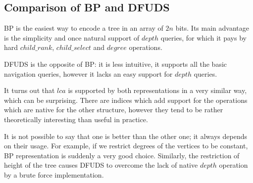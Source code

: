 \subsection{Comparison of BP and DFUDS}

BP is the easiest way to encode a tree in an array of $2n$ bits.
Its main advantage is the simplicity and once natural support of $depth$ queries, for which it pays by hard $child\_rank$, $child\_select$ and $degree$ operations.

DFUDS is the opposite of BP: it is less intuitive, it supports all the basic navigation queries, however it lacks an easy support for $depth$ queries.

It turns out that $lca$ is supported by both representations in a very similar way, which can be surprising.
There are indices which add support for the operations which are native for the other structure, however they tend to be rather theoretically interesting than useful in practice. 

It is not possible to say that one is better than the other one; it always depends on their usage.
For example, if we restrict degrees of the vertices to be constant, BP representation is suddenly a very good choice.
Similarly, the restriction of height of the tree causes DFUDS to overcome the lack of native $depth$ operation by a brute force implementation.